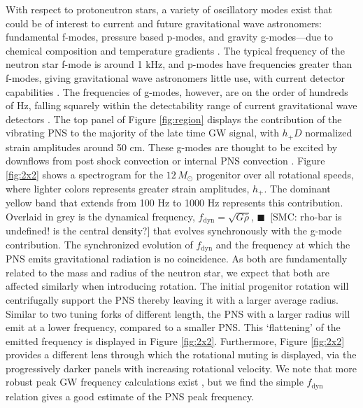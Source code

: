 \documentclass[twocolumn,times]{aastex62}  %
\newcommand{\smc}[1]{{\color{blue}$\blacksquare$~\textsf{[SMC: #1]}}}
\begin{document}
 
With respect to protoneutron stars, a variety of oscillatory modes exist that could be of interest to current and future gravitational wave astronomers: fundamental f-modes, pressure based p-modes, and gravity g-modes---due to chemical composition and temperature gradients \citep{unno:1989}.  The typical frequency of the neutron star f-mode is around 1 kHz, and p-modes have frequencies greater than f-modes, giving gravitational wave astronomers little use, with current detector capabilities \citep{ho:2018}.  
The frequencies of g-modes, however, are on the order of hundreds of Hz, falling squarely within the detectability range of current gravitational wave detectors \citep{martynov:2016}.  
The top panel of Figure \ref{fig:region} displays the contribution of the vibrating PNS to the majority of the late time GW signal, with $h_+D$ normalized strain amplitudes around 50 cm.  
These g-modes are thought to be excited by downflows from post shock convection or internal PNS convection \citep{murphy:2009,marek:2009b,muller:2013}.  
Figure \ref{fig:2x2} shows a spectrogram for the $12 \, M_\odot$ progenitor over all rotational speeds, where lighter colors represents greater strain amplitudes, $h_+$.  The dominant yellow band that extends from 100 Hz to 1000 Hz represents this contribution.  
Overlaid in grey is the dynamical frequency, $f_\mathrm{dyn} = \sqrt{G \overline{\rho}}$, \smc{rho-bar is undefined! is the central density?} that evolves synchronously with the g-mode contribution.  The synchronized evolution of $f_\mathrm{dyn}$ and the frequency at which the PNS emits gravitational radiation is no coincidence.  As both are fundamentally related to the mass and radius of the neutron star, we expect that both are affected similarly when introducing rotation.  The initial progenitor rotation will centrifugally support the PNS thereby leaving it with a larger average radius.  Similar to two tuning forks of different length, the PNS with a larger radius will emit at a lower frequency, compared to a smaller PNS.  This `flattening' of the emitted frequency is displayed in Figure \ref{fig:2x2}.  Furthermore, Figure \ref{fig:2x2} provides a different lens through which the rotational muting is displayed, via the progressively darker panels with increasing rotational velocity.  We note that more robust peak GW frequency calculations exist \citep[e.g.,][]{muller:2013,moro:2018}, but we find the simple $f_\mathrm{dyn}$ relation gives a good estimate of the PNS peak frequency.
\end{document}
